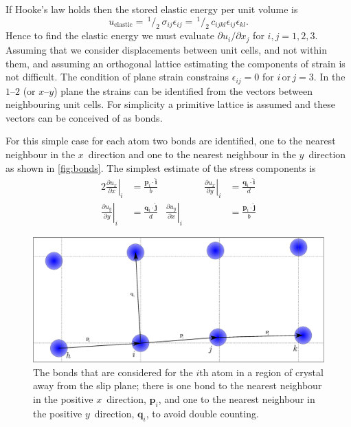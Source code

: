 If Hooke's law holds then the stored elastic energy per unit volume is
\begin{equation}
u_{\text{elastic}} =\, ^{1}\!/_{2}\, \sigma_{ij} \epsilon_{ij} =\, ^{1}\!/_{2}\, c_{ijkl} \epsilon_{ij} \epsilon_{kl}.
\end{equation}
Hence to find the elastic energy we must evaluate \({\partial u_i}/{\partial x_j}\) for $i, j = 1, 2, 3$.
Assuming that we consider displacements between unit cells, and not within them, and assuming an orthogonal lattice estimating the components of strain is not difficult. The  condition of plane strain constrains $\epsilon_{ij} = 0$ for $i\, \text{or}\, j=3$. In the $1$--$2$ (or $x$--$y$) plane the strains can be identified from the vectors between neighbouring unit cells. For simplicity a primitive lattice is assumed and these vectors can be conceived of as bonds.

For this simple case for each atom two bonds are identified, one to the nearest neighbour in the $x$~direction and one to the nearest neighbour in the $y$~direction as shown in \autoref{fig:bonds}. The simplest estimate of the stress components is
\begin{alignat}{2}\label{eqn:estimate_strains}
\left. \frac{\partial u_x}{\partial x}\right|_i &= \frac{\mathbf{p}_i \cdot \mathbf{\hat{i}}}{b} &\qquad\qquad
\left. \frac{\partial u_x}{\partial y}\right|_i &= \frac{\mathbf{q}_i \cdot \mathbf{\hat{i}}}{d} \nonumber\\
\left. \frac{\partial u_y}{\partial y}\right|_i &= \frac{\mathbf{q}_i \cdot \mathbf{\hat{j}}}{d} &
\left. \frac{\partial u_y}{\partial x}\right|_i &= \frac{\mathbf{p}_i \cdot \mathbf{\hat{j}}}{b}
\end{alignat}


\begin{figure}
\centering
\includegraphics[width=\textwidth]{bonds}
\caption{The bonds that are considered for the $i$th atom in a region of crystal away from the slip plane; there is one bond to the nearest neighbour in the positive $x$~direction, $\mathbf{p}_i$, and one to the nearest neighbour in the positive $y$~direction, $\mathbf{q}_i$, to avoid double counting.\label{fig:bonds} }
\end{figure}





